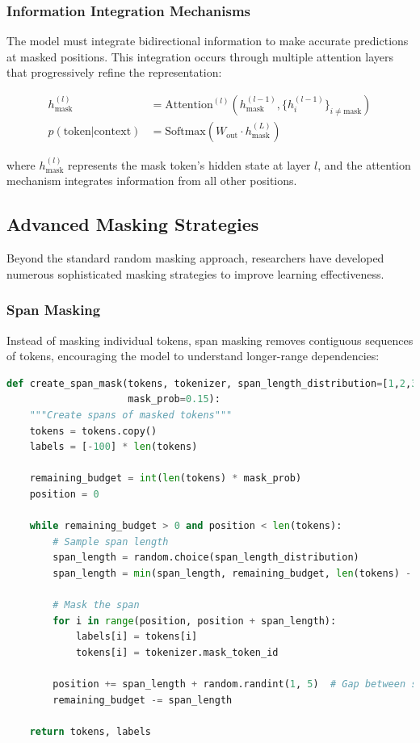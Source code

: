 \subsubsection{Information Integration Mechanisms}

The model must integrate bidirectional information to make accurate predictions at masked positions. This integration occurs through multiple attention layers that progressively refine the representation:

\begin{align}
h_{\text{mask}}^{(l)} &= \text{Attention}^{(l)}(h_{\text{mask}}^{(l-1)}, \{h_i^{(l-1)}\}_{i \neq \text{mask}}) \\
p(\text{token} | \text{context}) &= \text{Softmax}(W_{\text{out}} \cdot h_{\text{mask}}^{(L)})
\end{align}

where $h_{\text{mask}}^{(l)}$ represents the mask token's hidden state at layer $l$, and the attention mechanism integrates information from all other positions.

\subsection{Advanced Masking Strategies}

Beyond the standard random masking approach, researchers have developed numerous sophisticated masking strategies to improve learning effectiveness.

\subsubsection{Span Masking}

Instead of masking individual tokens, span masking removes contiguous sequences of tokens, encouraging the model to understand longer-range dependencies:

\begin{lstlisting}[language=Python, caption=Span masking implementation]
def create_span_mask(tokens, tokenizer, span_length_distribution=[1,2,3,4,5], 
                     mask_prob=0.15):
    """Create spans of masked tokens"""
    tokens = tokens.copy()
    labels = [-100] * len(tokens)
    
    remaining_budget = int(len(tokens) * mask_prob)
    position = 0
    
    while remaining_budget > 0 and position < len(tokens):
        # Sample span length
        span_length = random.choice(span_length_distribution)
        span_length = min(span_length, remaining_budget, len(tokens) - position)
        
        # Mask the span
        for i in range(position, position + span_length):
            labels[i] = tokens[i]
            tokens[i] = tokenizer.mask_token_id
        
        position += span_length + random.randint(1, 5)  # Gap between spans
        remaining_budget -= span_length
    
    return tokens, labels
\end{lstlisting}

